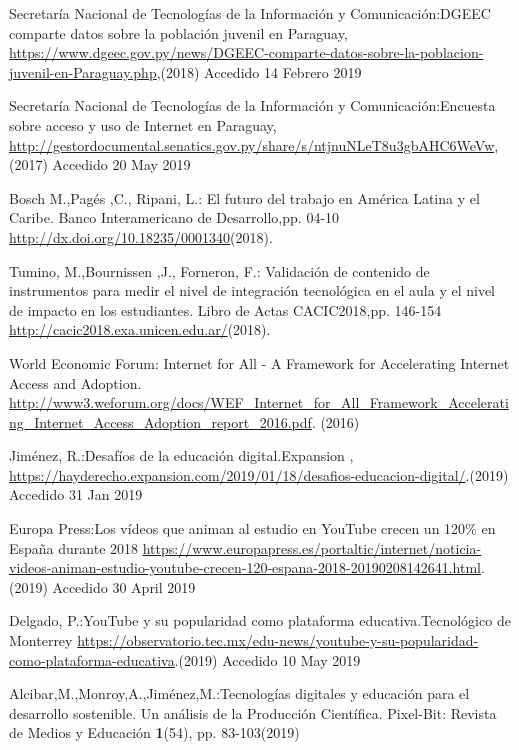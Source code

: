 \documentclass[runningheads]{llncs}
\begin{document}
\begin{thebibliography}{20}

Secretaría Nacional de Tecnologías de la Información y Comunicación:DGEEC comparte datos sobre la población juvenil en Paraguay, \url{https://www.dgeec.gov.py/news/DGEEC-comparte-datos-sobre-la-poblacion-juvenil-en-Paraguay.php},(2018) Accedido 14 Febrero 2019

Secretaría Nacional de Tecnologías de la Información y Comunicación:Encuesta sobre acceso y uso de Internet en Paraguay, \url{http://gestordocumental.senatics.gov.py/share/s/ntjnuNLeT8u3gbAHC6WeVw},(2017) Accedido 20 May 2019

Bosch M.,Pagés ,C., Ripani, L.: El futuro del trabajo en América Latina y el Caribe. Banco Interamericano de Desarrollo,pp. 04-10
 \url{http://dx.doi.org/10.18235/0001340}(2018).
 
Tumino, M.,Bournissen ,J., Forneron, F.: Validación de contenido de instrumentos para medir el
nivel de integración tecnológica en el aula y el nivel de impacto en los estudiantes. Libro de     Actas CACIC2018,pp. 146-154
 \url{http://cacic2018.exa.unicen.edu.ar/}(2018).

World Economic Forum: Internet for All - A Framework for Accelerating Internet Access and Adoption. \url{http://www3.weforum.org/docs/WEF_Internet_for_All_Framework_Accelerating_Internet_Access_Adoption_report_2016.pdf}. (2016)

Jiménez, R.:Desafíos  de  la  educación  digital.Expansion , \url{https://hayderecho.expansion.com/2019/01/18/desafios-educacion-digital/}.(2019) Accedido 31 Jan 2019

Europa Press:Los vídeos que animan al estudio en YouTube crecen un 120\% en España durante 2018  \url{https://www.europapress.es/portaltic/internet/noticia-videos-animan-estudio-youtube-crecen-120-espana-2018-20190208142641.html}.(2019) Accedido 30 April 2019

Delgado, P.:YouTube y su popularidad como plataforma educativa.Tecnológico de Monterrey \url{https://observatorio.tec.mx/edu-news/youtube-y-su-popularidad-como-plataforma-educativa}.(2019) Accedido 10 May 2019

Alcibar,M.,Monroy,A.,Jiménez,M.:Tecnologías digitales y educación para el desarrollo sostenible. Un análisis de la Producción Científica. Pixel-Bit: Revista de Medios y Educación \textbf{1}(54),  pp. 83-103(2019)


\end{thebibliography}
\end{document}
